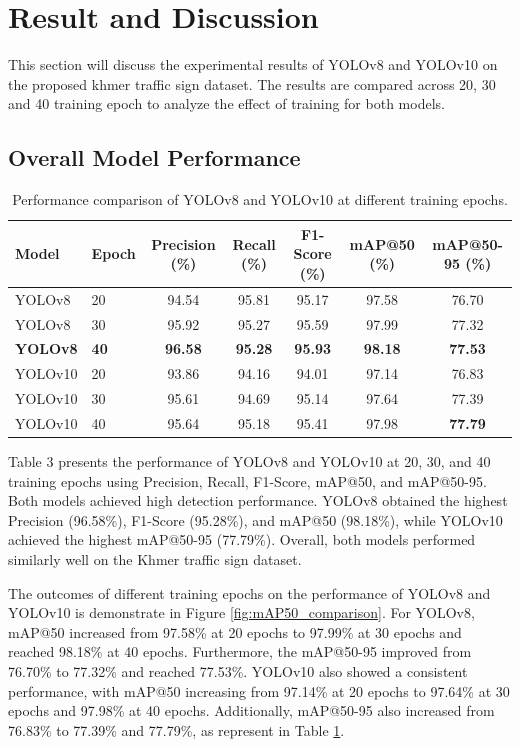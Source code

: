 \section{Result and Discussion}
This section will discuss the experimental results of YOLOv8 and YOLOv10 on the proposed khmer traffic sign dataset.
The results are compared across 20, 30 and 40 training epoch to analyze the effect of training for both models.
\subsection{Overall Model Performance}
\begin{table}[t]
    \centering
    \caption{Performance comparison of YOLOv8 and YOLOv10 at different training epochs.}
    \label{tab:model_performance}
    \begin{tabular}{llccccc}
        \hline\hline
        Model & Epoch & Precision (\%) & Recall (\%) & F1-Score (\%) 
        & mAP@50 (\%) & mAP@50-95 (\%) \\
        \hline
        YOLOv8  & 20 & 94.54 & 95.81 & 95.17 & 97.58 & 76.70 \\
        YOLOv8  & 30 & 95.92 & 95.27 & 95.59 & 97.99 & 77.32 \\
        \textbf{YOLOv8}  & \textbf{40} & \textbf{96.58} & \textbf{95.28} & \textbf{95.93} 
                 & \textbf{98.18} & \textbf{77.53} \\
        \hline
        YOLOv10 & 20 & 93.86 & 94.16 & 94.01 & 97.14 & 76.83 \\
        YOLOv10 & 30 & 95.61 & 94.69 & 95.14 & 97.64 & 77.39 \\
        YOLOv10 & 40 & 95.64 & 95.18 & 95.41 & 97.98 & \textbf{77.79} \\
        \hline\hline
    \end{tabular}
\end{table}
Table 3 presents the performance of YOLOv8 and YOLOv10 at 20, 30, and 40 training epochs using Precision, Recall, F1-Score, mAP@50, and mAP@50-95. Both models achieved high detection performance. YOLOv8 obtained the highest Precision (96.58\%), F1-Score (95.28\%), and mAP@50 (98.18\%), while YOLOv10 achieved the highest mAP@50-95 (77.79\%). Overall, both models performed similarly well on the Khmer traffic sign dataset.

The outcomes of different training epochs on the performance of YOLOv8 and YOLOv10 is demonstrate in Figure \ref{fig:mAP50_comparison}. For YOLOv8, mAP@50 increased from 97.58\% at 20 epochs
to 97.99\% at 30 epochs and reached 98.18\% at 40 epochs. Furthermore, the mAP@50-95 improved from 76.70\% to 77.32\% and reached 77.53\%.
YOLOv10 also showed a consistent performance, with mAP@50 increasing from 97.14\% at 20 epochs to 97.64\% at 30 epochs and 97.98\% at 40 epochs. Additionally, 
mAP@50-95 also increased from 76.83\% to 77.39\% and 77.79\%, as represent in Table \ref{tab:model_performance}.  

